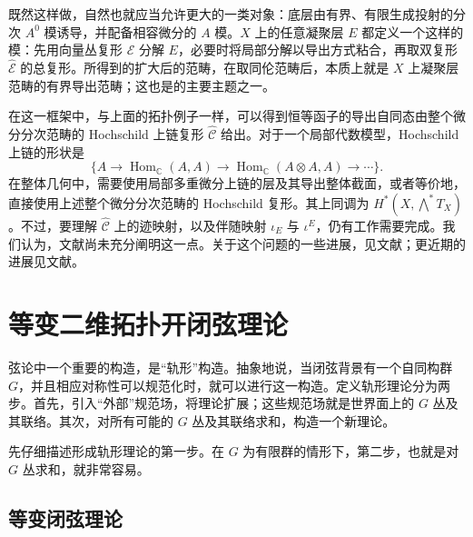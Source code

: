既然这样做，自然也就应当允许更大的一类对象：底层由有界、有限生成投射的分次 $A^0$ 模诱导，并配备相容微分的 $A$ 模。$X$ 上的任意凝聚层 $E$ 都定义一个这样的模：先用向量丛复形 $\mathcal{E}$ 分解 $E$，必要时将局部分解以导出方式粘合，再取双复形 $\widehat{\mathcal{E}}$ 的总复形。所得到的扩大后的范畴，在取同伦范畴后，本质上就是 $X$ 上凝聚层范畴的有界导出范畴；这也是的主要主题之一。

在这一框架中，与上面的拓扑例子一样，可以得到恒等函子的导出自同态由整个微分分次范畴的 Hochschild 上链复形 $\widehat{\mathcal{C}}$ 给出。对于一个局部代数模型，Hochschild 上链的形状是
\[
\bigl\{A\longrightarrow\operatorname{Hom}_{\mathbb{C}}(A,A)
\longrightarrow\operatorname{Hom}_{\mathbb{C}}(A\otimes A,A)\longrightarrow\cdots\bigr\}.
\]
在整体几何中，需要使用局部多重微分上链的层及其导出整体截面，或者等价地，直接使用上述整个微分分次范畴的 Hochschild 复形。其上同调为 $H^*(X,\bigwedge^*T_X)$。不过，要理解 $\widehat{\mathcal{C}}$ 上的迹映射，以及伴随映射 $\iota_E$ 与 $\iota^E$，仍有工作需要完成。我们认为，文献尚未充分阐明这一点。关于这个问题的一些进展，见文献；更近期的进展见文献。

\section{等变二维拓扑开闭弦理论}\label{sec:2.6}

弦论中一个重要的构造，是“轨形”构造。抽象地说，当闭弦背景有一个自同构群 $G$，并且相应对称性可以规范化时，就可以进行这一构造。定义轨形理论分为两步。首先，引入“外部”规范场，将理论扩展；这些规范场就是世界面上的 $G$ 丛及其联络。其次，对所有可能的 $G$ 丛及其联络求和，构造一个新理论。

先仔细描述形成轨形理论的第一步。在 $G$ 为有限群的情形下，第二步，也就是对 $G$ 丛求和，就非常容易。

\subsection{等变闭弦理论}\label{sec:2.6.1}


